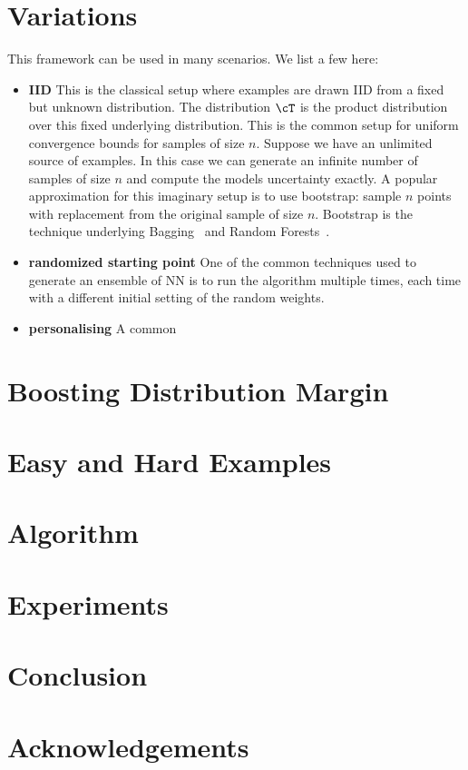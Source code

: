 \section{Variations}
This framework can be used in many scenarios. We list a few here:
\begin{itemize}
    \item {\bf IID} This is the classical setup where examples are drawn IID from a fixed but unknown distribution. The distribution $\cT$ is the product distribution over this fixed underlying distribution. This is the common setup for uniform convergence bounds for samples of size $n$. 
    Suppose we have an unlimited source of examples. In this case we can generate an infinite number of samples of size $n$ and compute the models uncertainty exactly.  A popular approximation for this imaginary setup is to use bootstrap: sample $n$ points with replacement from the original sample of size $n$. Bootstrap is the technique underlying Bagging~\cite{} and Random Forests~\cite{}.
    \item {\bf randomized starting point} One of the common techniques used to generate an ensemble of NN is to run the algorithm multiple times, each time with a different initial setting of the random weights.
    \item {\bf personalising} A common
\end{itemize}

\section{Boosting Distribution Margin}
\label{sec:boosting_distribution_margin}
\section{Easy and Hard Examples}
\label{sec:easy_ad_hard_examples}
\section{Algorithm}
\label{sec:algorithm}
\section{Experiments}
\label{sec:experiments}
\section{Conclusion}
\label{sec:conclusion}
\section*{Acknowledgements}

